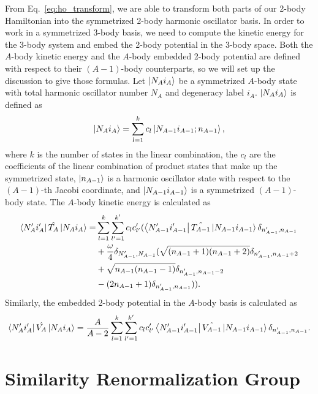 From Eq.~\ref{eq:ho_transform}, we are able to transform both parts of our 2-body Hamiltonian into the symmetrized 2-body harmonic oscillator basis. In order to work in a symmetrized 3-body basis, we need to compute the kinetic energy for the 3-body system and embed the 2-body potential in the 3-body space. Both the $A$-body kinetic energy and the $A$-body embedded 2-body potential are defined with respect to their $(A-1)$-body counterparts, so we will set up the discussion to give those formulas. Let $\ket{N_A i_A}$ be a symmetrized $A$-body state with total harmonic oscillator number $N_A$ and degeneracy label $i_A$. $\ket{N_A i_A}$ is defined as
\begin{equation}
\ket{N_A i_A} = \sum_{l=1}^k c_l \ket{N_{A-1} i_{A-1}; n_{A-1}},
\end{equation}
where $k$ is the number of states in the linear combination, the $c_l$ are the coefficients of the linear combination of product states that make up the symmetrized state, $\ket{n_{A-1}}$ is a harmonic oscillator state with respect to the $(A-1)$-th Jacobi coordinate, and $\ket{N_{A-1} i_{A-1}}$ is a symmetrized $(A-1)$-body state. The $A$-body kinetic energy is calculated as
\begin{equation}
\begin{aligned}
\bra{N_A' i_A'}\hat{T_A}\ket{N_A i_A} = & \sum_{l=1}^k \sum_{l'=1}^{k'} c_l c_{l'}' (\bra{N_{A-1}' i_{A-1}'}\hat{T_{A-1}}\ket{N_{A-1} i_{A-1}}\delta_{n_{A-1}',n_{A-1}} \\ 
& + \frac{\omega}{4}\delta_{N_{A-1}',N_{A-1}}(\sqrt{(n_{A-1} + 1)(n_{A-1} + 2)}\delta_{n_{A-1}',n_{A-1} + 2} \\
& + \sqrt{n_{A-1}(n_{A-1} - 1)}\delta_{n_{A-1}',n_{A-1} - 2} \\
& - (2 n_{A-1} + 1)\delta_{n_{A-1}',n_{A-1}})).
\end{aligned}
\end{equation}
Similarly, the embedded 2-body potential in the $A$-body basis is calculated as
\begin{equation}
\bra{N_A' i_A'}\hat{V_A}\ket{N_A i_A} = \frac{A}{A-2} \sum_{l=1}^k \sum_{l'=1}^{k'} c_l c_{l'}' \bra{N_{A-1}' i_{A-1}'}\hat{V_{A-1}}\ket{N_{A-1} i_{A-1}}\delta_{n_{A-1}',n_{A-1}}.
\end{equation}

\section{Similarity Renormalization Group}

